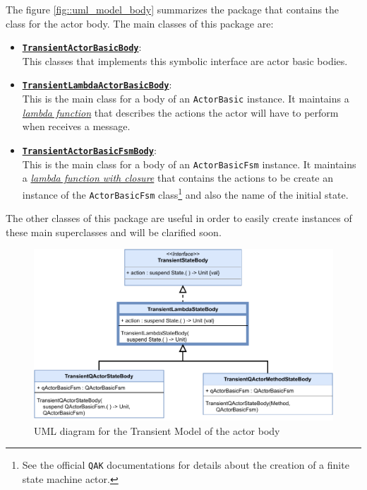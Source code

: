 The figure \ref{fig::uml_model_body} summarizes the package that contains the class for the actor body. The main classes of this package are:

\begin{itemize}
	\item 	\href{https://github.com/LM-96/QA-Extensions/blob/main/it.unibo.qakactor/src/main/kotlin/model/actorbody/TransientActorBasicBody.kt}{\underline{\textbf{\texttt{TransientActorBasicBody}}}}:\\
	This classes that implements this symbolic interface are actor basic bodies.
	
	\item 	\href{https://github.com/LM-96/QA-Extensions/blob/main/it.unibo.qakactor/src/main/kotlin/model/actorbody/TransientLambdaActorBasicBody.kt}{\underline{\textbf{\texttt{TransientLambdaActorBasicBody}}}}:\\
	This is the main class for a body of an \texttt{ActorBasic} instance. It maintains a \href{https://kotlinlang.org/docs/lambdas.html}{\textit{lambda function}} that describes the actions the actor will have to perform when receives a message.
	
	\item 	\href{https://github.com/LM-96/QA-Extensions/blob/main/it.unibo.qakactor/src/main/kotlin/model/actorbody/TransientActorBasicFsmBody.kt}{\underline{\textbf{\texttt{TransientActorBasicFsmBody}}}}:\\
	This is the main class for a body of an \texttt{ActorBasicFsm} instance. It maintains a \href{https://kotlinlang.org/docs/lambdas.html#closures}{\textit{lambda function with closure}} that contains the actions to be create an instance of the \texttt{ActorBasicFsm} class\footnote{See the official \texttt{QAK} documentations for details about the creation of a finite state machine actor.} and also the name of the initial state.
\end{itemize}

The other classes of this package are useful in order to easily create instances of these main superclasses and will be clarified soon.

\begin{figure}[h!]
	\centering
	\includegraphics[width=\textwidth]{img/[UML]it.unibo.kaktor.model.actorbody_onlystatebody}
	\caption{UML diagram for the Transient Model of the actor body}
	\label{fig::uml_model_state_body}
\end{figure}

